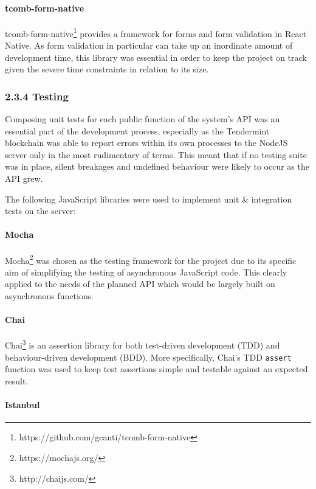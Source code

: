 \documentclass[12pt]{report}
\let\oldparagraph\paragraph
\renewcommand{\paragraph}[1]{\oldparagraph{#1}\mbox{}}
\begin{document}
\paragraph{tcomb-form-native}\label{tcomb-form-native}

tcomb-form-native\footnote{https://github.com/gcanti/tcomb-form-native}
provides a framework for forms and form validation in React Native. As
form validation in particular can take up an inordinate amount of
development time, this library was essential in order to keep the
project on track given the severe time constraints in relation to its
size.

\subsubsection{2.3.4 Testing}\label{testing}

Composing unit tests for each public function of the system's API was an
essential part of the development process, especially as the Tendermint
blockchain was able to report errors within its own processes to the
NodeJS server only in the most rudimentary of terms. This meant that if
no testing suite was in place, silent breakages and undefined behaviour
were likely to occur as the API grew.

The following JavaScript libraries were used to implement unit \&
integration tests on the server:

\paragraph{Mocha}\label{mocha}

Mocha\footnote{https://mochajs.org/} was chosen as the testing
framework for the project due to its specific aim of simplifying the
testing of asynchronous JavaScript code. This clearly applied to the
needs of the planned API which would be largely built on asynchronous
functions.

\paragraph{Chai}\label{chai}

Chai\footnote{http://chaijs.com/} is an assertion library for both
test-driven development (TDD) and behaviour-driven development (BDD).
More specifically, Chai's TDD \texttt{assert} function was used to keep
test assertions simple and testable against an expected result.

\paragraph{Istanbul}\label{istanbul}
\end{document}
